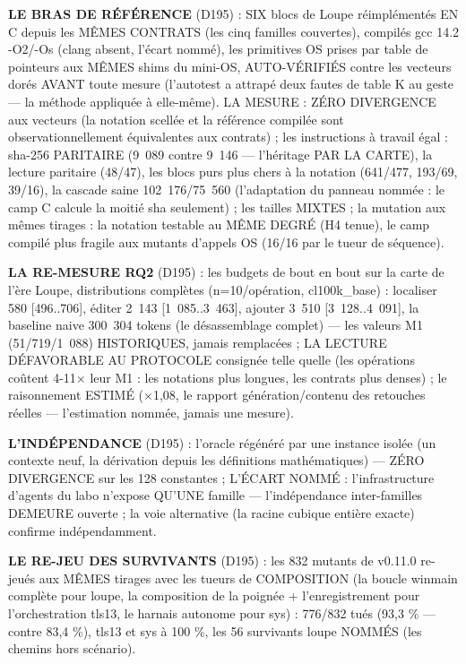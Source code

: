 \textbf{LE BRAS DE RÉFÉRENCE} (D195) : SIX blocs de Loupe réimplémentés
EN C depuis les MÊMES CONTRATS (les cinq familles couvertes), compilés
gcc 14.2 -O2/-Os (clang absent, l'écart nommé), les primitives OS prises
par table de pointeurs aux MÊMES shims du mini-OS, AUTO-VÉRIFIÉS contre
les vecteurs dorés AVANT toute mesure (l'autotest a attrapé deux fautes
de table K au geste — la méthode appliquée à elle-même). LA MESURE :
ZÉRO DIVERGENCE aux vecteurs (la notation scellée et la référence
compilée sont observationnellement équivalentes aux contrats) ; les
instructions à travail égal : sha-256 PARITAIRE (9~089 contre 9~146 —
l'héritage PAR LA CARTE), la lecture paritaire (48/47), les blocs purs
plus chers à la notation (641/477, 193/69, 39/16), la cascade saine
102~176/75~560 (l'adaptation du panneau nommée : le camp C calcule la
moitié sha seulement) ; les tailles MIXTES ; la mutation aux mêmes
tirages : la notation testable au MÊME DEGRÉ (H4 tenue), le camp compilé
plus fragile aux mutants d'appels OS (16/16 par le tueur de séquence).

\textbf{LA RE-MESURE RQ2} (D195) : les budgets de bout en bout sur la
carte de l'ère Loupe, distributions complètes (n=10/opération,
cl100k\_base) : localiser 580 [496..706], éditer 2~143 [1~085..3~463],
ajouter 3~510 [3~128..4~091], la baseline naive 300~304 tokens (le
désassemblage complet) — les valeurs M1 (51/719/1~088) HISTORIQUES,
jamais remplacées ; LA LECTURE DÉFAVORABLE AU PROTOCOLE consignée telle
quelle (les opérations coûtent 4-11$\times$ leur M1 : les notations plus
longues, les contrats plus denses) ; le raisonnement ESTIMÉ
($\times$1,08, le rapport génération/contenu des retouches réelles —
l'estimation nommée, jamais une mesure).

\textbf{L'INDÉPENDANCE} (D195) : l'oracle régénéré par une instance
isolée (un contexte neuf, la dérivation depuis les définitions
mathématiques) — ZÉRO DIVERGENCE sur les 128 constantes ; L'ÉCART NOMMÉ :
l'infrastructure d'agents du labo n'expose QU'UNE famille — l'indépendance
inter-familles DEMEURE ouverte ; la voie alternative (la racine cubique
entière exacte) confirme indépendamment.

\textbf{LE RE-JEU DES SURVIVANTS} (D195) : les 832 mutants de v0.11.0
re-jeués aux MÊMES tirages avec les tueurs de COMPOSITION (la boucle
winmain complète pour loupe, la composition de la poignée +
l'enregistrement pour l'orchestration tls13, le harnais autonome pour
sys) : 776/832 tués (93,3 \% — contre 83,4 \%), tls13 et sys à
100 \%, les 56 survivants loupe NOMMÉS (les chemins hors scénario).

